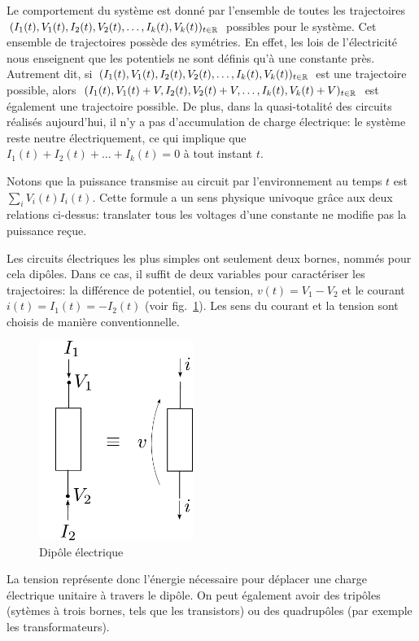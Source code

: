 Le comportement du système est donné par l'ensemble de toutes les trajectoires $(I_1(t), V_1(t), I_2(t), V_2(t), \ldots, I_k(t), V_k(t))_{t \in \mathbb{R}}$ possibles pour le système. Cet ensemble de trajectoires possède des symétries. En effet, les lois de l'électricité nous enseignent que les potentiels ne sont définis qu'à une constante près. Autrement dit, si $(I_1(t), V_1(t), I_2(t), V_2(t), \ldots, I_k(t), V_k(t))_{t \in \mathbb{R}}$ est une trajectoire possible, alors $(I_1(t), V_1(t)+V, I_2(t), V_2(t)+V, \ldots, I_k(t), V_k(t)+V)_{t \in \mathbb{R}}$ est également une trajectoire possible. De plus, dans la quasi-totalité des circuits réalisés aujourd'hui, il n'y a pas d'accumulation de charge électrique: le système reste neutre électriquement, ce qui implique que $I_1(t) + I_2(t) + \ldots + I_k(t)=0$ à tout instant $t$.

Notons que la puissance transmise au circuit par l'environnement au temps $t$ est $\sum_i V_i(t) I_i(t)$. Cette formule a un sens physique univoque grâce aux deux relations ci-dessus: translater tous les voltages d'une constante ne modifie pas la puissance reçue. 


Les circuits électriques les plus simples ont seulement deux bornes, nommés  pour cela dipôles. Dans ce cas, il suffit de deux variables pour caractériser les trajectoires: la différence de potentiel, ou tension, $v(t)=V_1-V_2$ et le courant $i(t)=I_1(t)=-I_2(t)$ (voir fig.~\ref{fig:dipole}). Les sens du courant et la tension sont choisis de manière conventionnelle.
\begin{figure}[t]
\begin{center}
\includegraphics[width=5cm]{dipole2}
\caption{Dipôle électrique}
\label{fig:dipole}
\end{center}
\end{figure}
La tension représente donc l'énergie nécessaire pour déplacer une charge électrique unitaire à travers le dipôle.  On peut également avoir des tripôles (sytèmes à trois bornes, tels que les transistors) ou des quadrupôles (par exemple les transformateurs). 

